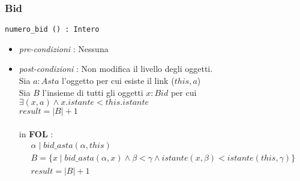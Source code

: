 \documentclass[12pt, letterpaper]{article}
\newcommand{\acc}{\\\hphantom{}\\}
\newcommand{\code}[1]{\colorbox{light-gray}{\texttt{#1}}}
\begin{document}
\subsubsection{Bid}
\code{numero\_bid () : Intero}\begin{itemize}
    \item \textit{pre-condizioni} : Nessuna
    \item \textit{post-condizioni} : Non modifica il livello degli oggetti.\\ 
    Sia $a:Asta$ l'oggetto per cui esiste il link ($this,a$)\\ 
    Sia $B$ l'insieme di tutti gli oggetti $x:Bid$ per cui $\exists (x,a) \land x.istante<this.istante$\\ 
    $result = |B|+1$\acc 
    in \textbf{FOL} : $$\begin{matrix}
        \alpha \;|\; bid\_asta(\alpha,this)\\ 
        B = \{ x  \;|\; bid\_asta(\alpha,x) \land \beta < \gamma \land istante(x, \beta)<istante(this,\gamma)\}\\ 
        result = |B| +1
    \end{matrix} $$

\end{itemize}
\end{document}
